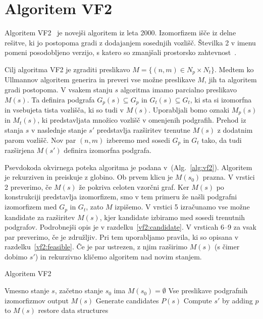 \documentclass[a4paper, 12pt, ]{book}
\newcommand{\refalg}[1]{(Alg.~\ref{#1})}
\begin{document}
\chapter{Algoritem VF2}
	
	Algoritem VF2~\cite{vf2, vf2_2} je novejši algoritem iz leta 2000. Izomorfizem išče iz delne rešitve, ki jo postopoma gradi z dodajanjem sosednjih vozlišč.
	Številka 2 v imenu pomeni posodobljeno verzijo, s katero so zmanjšali prostorsko zahtevnost~\cite{vf2_3}.

	Cilj algoritma VF2 je zgraditi preslikavo $M = \{(n,m) \in N_p \times N_t\}$. Medtem ko Ullmannov algoritem generira in preveri vse možne preslikave
	$M$, jih ta algoritem gradi postopoma. V vsakem stanju $s$ algoritma imamo parcialno preslikavo $M(s)$. Ta definira podgrafa $G_p(s) \subseteq G_p$ 
	in $G_t(s) \subseteq G_t$, ki sta si izomorfna in vsebujeta tista vozlišča, ki so tudi v $M(s)$. Uporabljali bomo oznaki $M_p(s)$ in $M_t(s)$,
	ki predstavljata množico vozlišč v omenjenih podgrafih.	Prehod iz stanja $s$ v naslednje stanje $s'$ predstavlja razširitev trenutne $M(s)$ z dodatnim
	parom vozlišč. Nov par $(n, m)$ izberemo med sosedi $G_p$ in $G_t$ tako, da tudi razširjena $M(s')$ definira izomorfna podgrafa.
	
	Psevdokoda okvirnega poteka algoritma je podana v~\refalg{alg:vf2}. Algoritem je rekurziven in preiskuje z globino. Ob prvem klicu je $M(s_0)$ prazna.
	V vrstici 2 preverimo,
	če $M(s)$ že pokriva celoten vzorčni graf. Ker $M(s)$ po konstrukciji predstavlja izomorfizem, smo v tem primeru že našli podgrafni izomorfizem med
	$G_p$ in $G_t$, zato $M$ izpišemo. V vrstici 5 izračunamo vse možne kandidate za razširitev $M(s)$, kjer kandidate izbiramo med sosedi trenutnih
	podgrafov. Podrobnejši opis je v razdelku~\ref{vf2:candidate}. V vrsticah 6--9 za vsak par preverimo, če je združljiv. Pri tem uporabljamo pravila, ki so
	opisana v razdelku~\ref{vf2:feasible}. Če je par ustrezen, z njim razširimo $M(s)$ (s čimer dobimo $s'$) in rekurzivno kličemo algoritem nad novim
	stanjem.

\begin{algorithm}
\caption{Algoritem VF2}
\label{alg:vf2}
\begin{algorithmic}[1]
	\Require Vmesno stanje $s$, začetno stanje $s_0$ ima $M(s_0) = \emptyset $
	\Ensure Vse preslikave podgrafnih izomorfizmov
			\State output $M(s)$
		\Else
			\State Generate candidates $P(s)$
					\State Compute $s'$ by adding $p$ to $M(s)$
					\State {}
				\EndIf
			\EndFor
		\EndIf
		\State restore data structures
	\EndProcedure
\end{algorithmic}
\end{algorithm}
\end{document}
